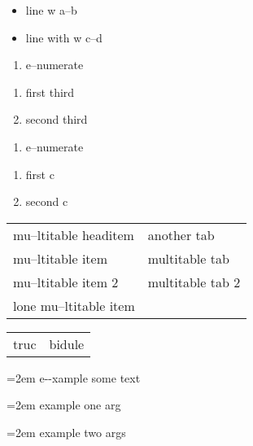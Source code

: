 \documentclass{book}
\begin{document}
\begin{titlepage}
\begin{itemize}[label=\hbox{} on a line]
\item line w a--b
\item line with w c--d
\end{itemize}

\begin{enumerate}[start=1]
\item e--numerate
\end{enumerate}

\begin{enumerate}[start=3]
\item first third
\item second third
\end{enumerate}

\begin{enumerate}[label=\alph*.]
\item e--numerate
\end{enumerate}

\begin{enumerate}[label=\alph*.,start=3]
\item first c
\item second c
\end{enumerate}

\begin{tabular}{m{} m{}}%
mu--ltitable headitem &another tab\\
mu--ltitable item &multitable tab\\
mu--ltitable item 2 &multitable tab 2
\index[cp]{index entry within multitable}%
\\
lone mu--ltitable item&\\
\end{tabular}%

\begin{tabular}{m{} m{}}%
truc &bidule\\
\end{tabular}%

\par\begingroup\obeylines\obeyspaces\frenchspacing\leftskip=2em \parskip=0pt \parindent=0pt \ttfamily%
e{-}{-}xample  some
   text
\endgroup{}%

\par\begingroup\obeylines\obeyspaces\frenchspacing\leftskip=2em \parskip=0pt \parindent=0pt \ttfamily%
example one arg
\endgroup{}%

\par\begingroup\obeylines\obeyspaces\frenchspacing\leftskip=2em \parskip=0pt \parindent=0pt \ttfamily%
example two args
\endgroup{}%


\end{titlepage}
\end{document}
